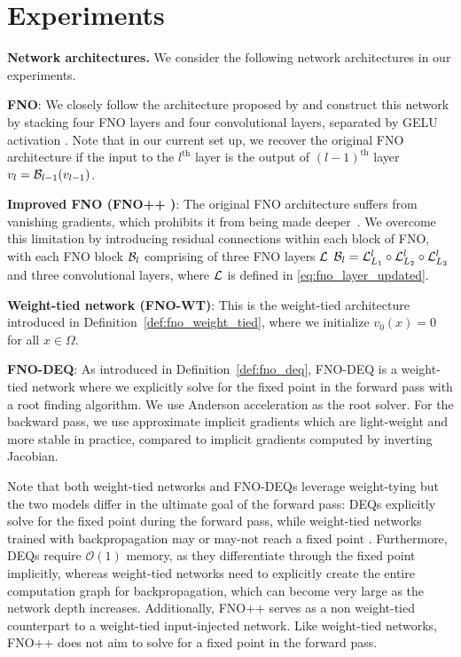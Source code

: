 \section{Experiments}
\label{sec:experiments}

\textbf{Network architectures.} We consider the following network architectures in our experiments.

\textbf{FNO}: We closely follow the architecture proposed by \citet{li2020fourier} and construct this network by stacking four FNO layers and four convolutional layers, separated by GELU activation \citep{gelu}. Note that in our current set up, we recover the original FNO architecture if the input to the $l^{\text{th}}$ layer is the output of $(l-1)^{\text{th}}$ layer \ie 
$v_l = {\mathcal{B}}_{l-1}(v_{l-1})$.

\textbf{Improved FNO (FNO++
)}: 
The original FNO architecture suffers from vanishing gradients, which prohibits it from being made deeper~\citep{tran2021factorized}. We overcome this limitation by introducing residual connections within each block of FNO, with each FNO block ${\mathcal{B}}_l$ comprising of three FNO layers ${\mathcal{L}}$ \ie ${\mathcal{B}}_l = {\mathcal{L}}^l_{L_1} \circ {\mathcal{L}}^l_{L_2} \circ {\mathcal{L}}^l_{L_3}$ and three convolutional layers, where ${\mathcal{L}}$ is defined in \cref{eq:fno_layer_updated}.

\textbf{Weight-tied network (FNO-WT)}: 
This is the weight-tied architecture introduced in Definition~\ref{def:fno_weight_tied},
where we initialize $v_0(x) = 0$ for all $x \in \Omega$.

\textbf{FNO-DEQ}: As introduced in Definition~\ref{def:fno_deq}, FNO-DEQ is a
weight-tied network where we explicitly solve for the fixed point in the forward pass with a root finding algorithm. 
We use Anderson acceleration \citep{anderson1965iterative} as the root solver. 
For the backward pass, we use approximate implicit gradients \citep{geng2021training} which are light-weight and more stable in practice, compared to implicit gradients computed by inverting Jacobian. 

Note that both weight-tied networks and FNO-DEQs leverage weight-tying but the two models differ in the ultimate goal of the forward pass: DEQs explicitly solve for the fixed point during the forward pass, while weight-tied networks trained with backpropagation may or may-not reach a fixed point \citep{anil2022path}. 
Furthermore, DEQs require $\mathcal{O}(1)$ memory, as they differentiate through the fixed point implicitly, whereas weight-tied networks need to explicitly create the entire computation graph for backpropagation, which can become very large as the network depth increases.
Additionally, FNO++ serves as a non weight-tied counterpart to a weight-tied input-injected network. Like weight-tied networks, FNO++ does not aim to solve for a fixed point in the forward pass.

